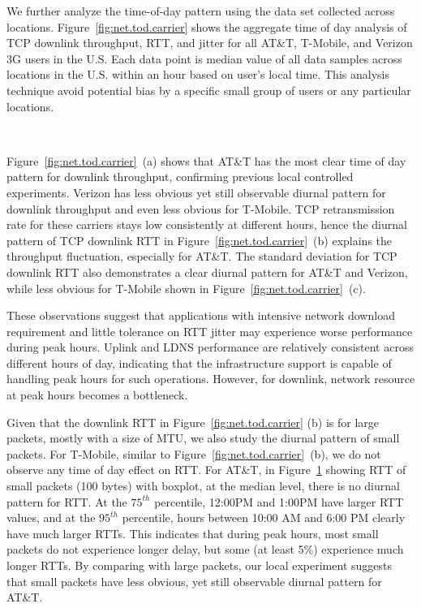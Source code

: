We further analyze the time-of-day pattern using the \mobiperf data set collected across locations. Figure~\ref{fig:net.tod.carrier} shows the
aggregate time of day analysis of TCP downlink throughput, RTT, and
jitter for all AT\&T, T-Mobile, and Verizon 3G users in the U.S. Each
data point is median value of all data samples across locations in the
U.S. within an hour based on user's local time. This analysis
technique avoid potential bias by a specific small group of users or any particular locations.

\begin{figure}[t]
\centering
{}\\
\label{fig:net.tod.rtt.att}
\end{figure}

Figure~\ref{fig:net.tod.carrier}~(a) shows that AT\&T has the most clear time of day pattern for downlink throughput, confirming previous local controlled experiments. 
Verizon has less obvious yet still observable diurnal pattern for
downlink throughput and even less obvious for T-Mobile. TCP
retransmission rate for these carriers stays low consistently at
different hours, hence the diurnal pattern of TCP downlink RTT in
Figure~\ref{fig:net.tod.carrier}~(b) explains the throughput fluctuation,
especially for AT\&T. The standard deviation for TCP downlink RTT also
demonstrates a clear diurnal pattern for AT\&T and Verizon, while less
obvious for T-Mobile shown in Figure~\ref{fig:net.tod.carrier}~(c).

These observations suggest that applications with intensive network download requirement and little tolerance on RTT jitter may experience worse performance during peak hours. Uplink and LDNS performance are relatively consistent across different hours of day, indicating that the infrastructure support is capable of handling peak hours for such operations. However, for downlink, network resource at peak hours becomes a bottleneck.

Given that the downlink RTT in Figure~\ref{fig:net.tod.carrier} (b) is for large packets, mostly with a size of MTU, we also study the diurnal pattern of small packets. For T-Mobile, similar to Figure~\ref{fig:net.tod.carrier}~(b), we do not observe any time of day effect on RTT. For AT\&T, in Figure~\ref{fig:net.tod.rtt.att} showing RTT of small packets (100 bytes) with boxplot, at the median level, there is no diurnal pattern for RTT. At the $75^{th}$ percentile, 12:00PM and 1:00PM have larger RTT values, and at the $95^{th}$ percentile, hours between 10:00 AM and 6:00 PM clearly have much larger RTTs. This indicates that during peak hours, most small packets do not experience longer delay, but some (at least 5\%) experience much longer RTTs. By comparing with large packets, our local experiment suggests that small packets have less obvious, yet still observable diurnal pattern for AT\&T.


